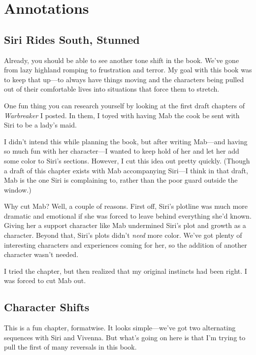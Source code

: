 \section*{Annotations}

\subsection*{Siri Rides South, Stunned}

Already, you should be able to see another tone shift in the book. We’ve gone from lazy highland romping to frustration and terror. My goal with this book was to keep that up—to always have things moving and the characters being pulled out of their comfortable lives into situations that force them to stretch.

One fun thing you can research yourself by looking at the first draft chapters of \textit{Warbreaker} I posted. In them, I toyed with having Mab the cook be sent with Siri to be a lady’s maid.

I didn’t intend this while planning the book, but after writing Mab—and having so much fun with her character—I wanted to keep hold of her and let her add some color to Siri’s sections. However, I cut this idea out pretty quickly. (Though a draft of this chapter exists with Mab accompanying Siri—I think in that draft, Mab is the one Siri is complaining to, rather than the poor guard outside the window.)

Why cut Mab? Well, a couple of reasons. First off, Siri’s plotline was much more dramatic and emotional if she was forced to leave behind everything she’d known. Giving her a support character like Mab undermined Siri’s plot and growth as a character. Beyond that, Siri’s plots didn’t \textit{need} more color. We’ve got plenty of interesting characters and experiences coming for her, so the addition of another character wasn’t needed.

I tried the chapter, but then realized that my original instincts had been right. I was forced to cut Mab out.

\subsection*{Character Shifts}

This is a fun chapter, formatwise. It looks simple—we’ve got two alternating sequences with Siri and Vivenna. But what’s going on here is that I’m trying to pull the first of many reversals in this book.

